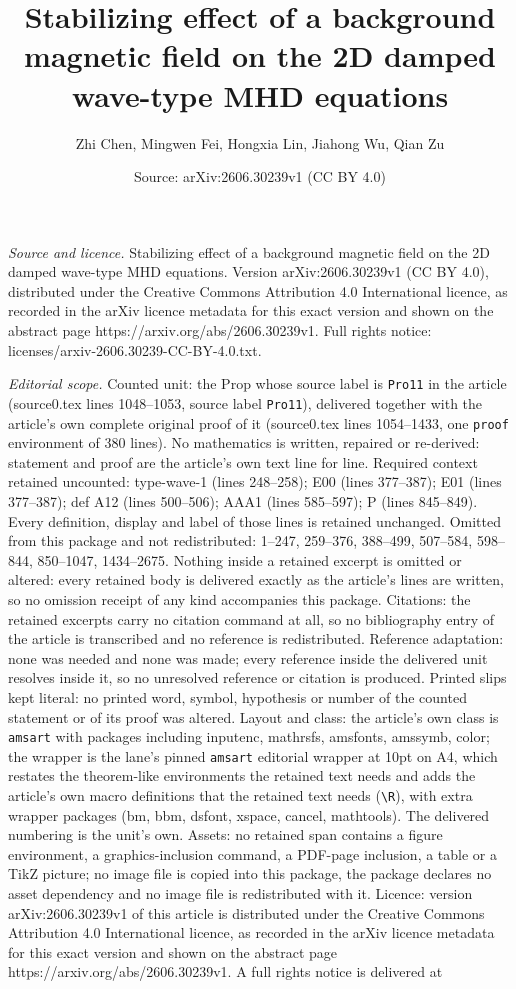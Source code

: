 \documentclass[10pt,a4paper]{amsart}
\title[Stabilizing effect of a background magnetic field on the 2D ]{Stabilizing effect of a background magnetic field on the 2D damped wave-type MHD equations}
\author{Zhi Chen, Mingwen Fei, Hongxia Lin, Jiahong Wu, Qian Zu}
\date{Source: arXiv:2606.30239v1 (CC BY 4.0)}
\begin{document}
\maketitle

\noindent\emph{Source and licence.} Stabilizing effect of a background magnetic field on the 2D damped wave-type MHD equations. Version arXiv:2606.30239v1 (CC BY 4.0), distributed under the Creative Commons Attribution 4.0 International licence, as recorded in the arXiv licence metadata for this exact version and shown on the abstract page https://arxiv.org/abs/2606.30239v1. Full rights notice: licenses/arxiv-2606.30239-CC-BY-4.0.txt.\par\smallskip

\noindent\textit{Editorial scope.} Counted unit: the Prop whose source label is \texttt{Pro11} in the article (source0.tex lines 1048--1053, source label \texttt{Pro11}), delivered together with the article's own complete original proof of it (source0.tex lines 1054--1433, one \texttt{proof} environment of 380 lines). No mathematics is written, repaired or re-derived: statement and proof are the article's own text line for line. Required context retained uncounted: type-wave-1 (lines 248--258); E00 (lines 377--387); E01 (lines 377--387); def A12 (lines 500--506); AAA1 (lines 585--597); P (lines 845--849). Every definition, display and label of those lines is retained unchanged. Omitted from this package and not redistributed: 1--247, 259--376, 388--499, 507--584, 598--844, 850--1047, 1434--2675. Nothing inside a retained excerpt is omitted or altered: every retained body is delivered exactly as the article's lines are written, so no omission receipt of any kind accompanies this package. Citations: the retained excerpts carry no citation command at all, so no bibliography entry of the article is transcribed and no reference is redistributed. Reference adaptation: none was needed and none was made; every reference inside the delivered unit resolves inside it, so no unresolved reference or citation is produced. Printed slips kept literal: no printed word, symbol, hypothesis or number of the counted statement or of its proof was altered. Layout and class: the article's own class is \texttt{amsart} with packages including inputenc, mathrsfs, amsfonts, amssymb, color; the wrapper is the lane's pinned \texttt{amsart} editorial wrapper at 10pt on A4, which restates the theorem-like environments the retained text needs and adds the article's own macro definitions that the retained text needs (\texttt{\textbackslash R}), with extra wrapper packages (bm, bbm, dsfont, xspace, cancel, mathtools). The delivered numbering is the unit's own. Assets: no retained span contains a figure environment, a graphics-inclusion command, a PDF-page inclusion, a table or a TikZ picture; no image file is copied into this package, the package declares no asset dependency and no image file is redistributed with it. Licence: version arXiv:2606.30239v1 of this article is distributed under the Creative Commons Attribution 4.0 International licence, as recorded in the arXiv licence metadata for this exact version and shown on the abstract page https://arxiv.org/abs/2606.30239v1. A full rights notice is delivered at 
\end{document}
